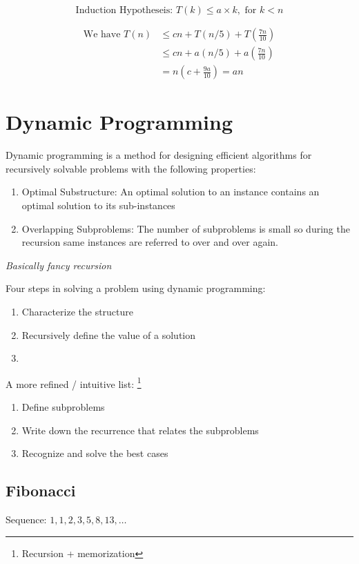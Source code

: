\documentclass{article}
\begin{document}
\begin{equation*}
    \text{Induction Hypotheseis: } T(k) \leq a\times k, \text{ for } k < n
\end{equation*}

\begin{align*}
    \text{We have } T(n) & \leq cn + T(n/5) + T(\frac{7n}{10})               \\
                         & \leq cn + a(n/5) + a \left( \frac{7n}{10} \right) \\
                         & = n(c + \frac{9a}{10}) = an
\end{align*}

\section*{Dynamic Programming}
Dynamic programming is a method for designing efficient algorithms for
recursively solvable problems with the following properties:

\begin{enumerate}
    \item Optimal Substructure: An optimal solution to an instance contains an
          optimal solution to its sub-instances
    \item Overlapping Subproblems: The number of subproblems is small so during
          the recursion same instances are referred to over and over again.
\end{enumerate}

\emph{Basically fancy recursion}

Four steps in solving a problem using dynamic programming:
\begin{enumerate}
    \item Characterize the structure
    \item Recursively define the value of a solution
    \item
\end{enumerate}

A more refined / intuitive list: \footnote{Recursion + memorization}
\begin{enumerate}
    \item Define subproblems
    \item Write down the recurrence that relates the subproblems
    \item Recognize and solve the best cases
\end{enumerate}

\subsection*{Fibonacci}
Sequence: \(1, 1, 2, 3, 5, 8, 13, \ldots\)
\end{document}
